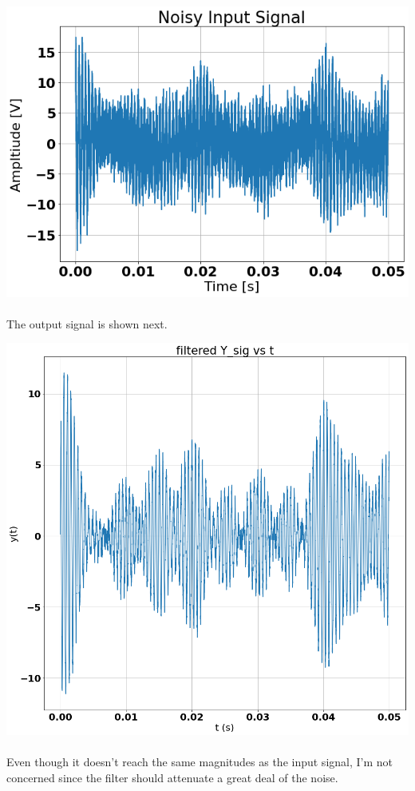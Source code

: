 \documentclass[12pt]{report}
\begin{document}
    \includegraphics[scale = 0.5]{Figure 2022-04-20 163927 (0).png}
    
    \paragraph{} The output signal is shown next.
    
    \includegraphics[scale = 0.3]{Figure 2022-04-20 163927 (11).png}
    
    \paragraph{} Even though it doesn't reach the same magnitudes as the input signal, I'm not concerned since the filter should attenuate a great deal of the noise.
    
\end{document}
